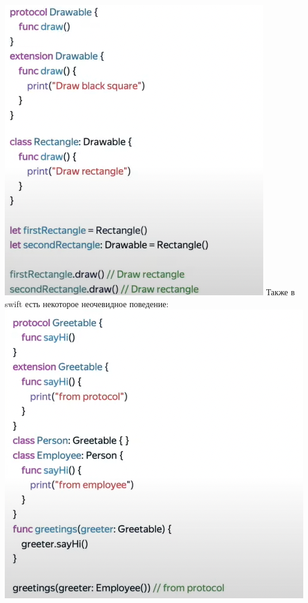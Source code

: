 \documentclass{article}
\begin{document}
    \includegraphics[scale = 0.5]{pic/Снимок экрана 2023-07-28 в 19.47.19.png}
    \newline
    Также в swift есть некоторое неочевидное поведение: 
    \newline
    \includegraphics[scale = 0.2]{pic/Снимок экрана 2023-07-28 в 19.52.22.png}
\end{document}
